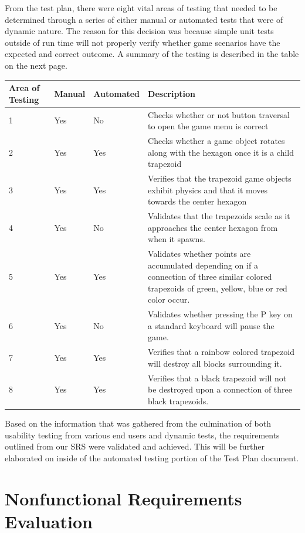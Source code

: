\documentclass[12pt, titlepage]{article}
\begin{document}
From the test plan, there were eight vital areas of testing that needed to be determined through a series of either manual or automated tests that were of dynamic nature. The reason for this decision was because simple unit tests outside of run time will not properly verify whether game scenarios have the expected and correct outcome. A summary of the testing is described in the table on the next page.

\begin{center}
    \begin{tabular}{ | l | l | l | p{5cm} |}
    \hline
    Area of Testing & Manual & Automated & Description \\ \hline
    1 & Yes & No & Checks whether or not button traversal to open the game menu is correct \\
    \hline
    2 & Yes & Yes & Checks whether a game object rotates along with the hexagon once it is a child trapezoid \\
    \hline
    3 & Yes & Yes & Verifies that the trapezoid game objects exhibit physics and that it moves towards the center hexagon \\
    \hline
    4 & Yes & No & Validates that the trapezoids scale as it approaches the center hexagon from when it spawns. \\
    \hline
    5 & Yes & Yes & Validates whether points are accumulated depending on if a connection of three similar colored trapezoids of green, yellow, blue or red color occur. \\
    \hline
    6 & Yes & No & Validates whether pressing the P key on a standard keyboard will pause the game. \\
    \hline
    7 & Yes & Yes & Verifies that a rainbow colored trapezoid will destroy all blocks surrounding it. \\
    \hline
    8 & Yes & Yes & Verifies that a black trapezoid will not be destroyed upon a connection of three black trapezoids. \\
    \hline
    \end{tabular}
\end{center}

Based on the information that was gathered from the culmination of both usability testing from various end users and dynamic tests, the requirements outlined from our SRS were validated and achieved. This will be further elaborated on inside of the automated testing portion of the Test Plan document. 

\section{Nonfunctional Requirements Evaluation}
\end{document}

